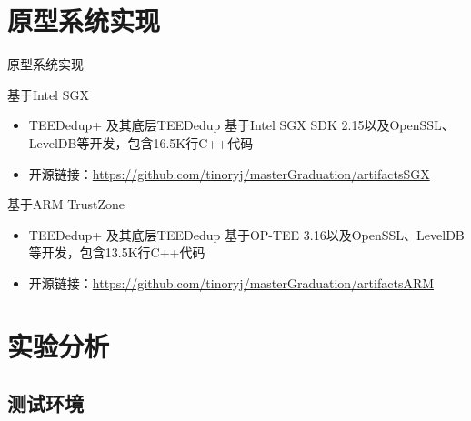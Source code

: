 \documentclass{beamer}
\newcommand{\sysnameS}{TEEDedup }
\newcommand{\prototype}{TEEDedup+ }
\begin{document}
\section{原型系统实现}

\begin{frame}{原型系统实现}
    \begin{textbox}{基于Intel SGX}
        \begin{itemize}
            \item \prototype 及其底层\sysnameS 基于Intel SGX SDK 2.15以及OpenSSL、LevelDB等开发，包含16.5K行C++代码
            \item 开源链接：\href{https://github.com/tinoryj/masterGraduation/artifactsSGX}{https://github.com/tinoryj/masterGraduation/artifactsSGX}
        \end{itemize}
    \end{textbox}

    \begin{textbox}{基于ARM TrustZone}
        \begin{itemize}
            \item \prototype 及其底层\sysnameS 基于OP-TEE 3.16以及OpenSSL、LevelDB等开发，包含13.5K行C++代码
            \item 开源链接：\href{https://github.com/tinoryj/masterGraduation/artifactsARM}{https://github.com/tinoryj/masterGraduation/artifactsARM}
        \end{itemize}
    \end{textbox}
\end{frame}

\section{实验分析}

\subsection{测试环境}
\end{document}
